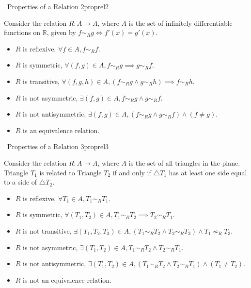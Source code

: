        \begin{exercise}{\Difficulty\,\Difficulty\,\,Properties of a Relation 2}{proprel2}
        
            Consider the relation \(R:A\to A\), where \(A\) is the set of infinitely differentiable functions on \(\mathbb{R}\), given by \(f\sim_Rg\iff f'(x)=g'(x)\).
            \begin{itemize}
                \item \(R\) is reflexive, \(\forall f\in A, f\sim_Rf\).
                \item \(R\) is symmetric, \(\forall (f, g)\in A, f\sim_Rg\implies g\sim_Rf\).
                \item \(R\) is transitive, \(\forall (f, g, h)\in A, (f\sim_Rg\wedge g\sim_Rh)\implies f\sim_Rh\).
                \item \(R\) is not asymmetric, \(\exists (f, g)\in A,f\sim_Rg\wedge g\sim_Rf\).
                \item \(R\) is not antisymmetric, \(\exists (f, g)\in A,(f\sim_Rg\wedge g\sim_Rf)\wedge(f\neq g)\).
                \item \(R\) is an equivalence relation.
            \end{itemize}
        
        \end{exercise}
        \begin{exercise}{\Difficulty\,\Difficulty\,\,Properties of a Relation 3}{proprel3}
        
            Consider the relation \(R:A\to A\), where \(A\) is the set of all triangles in the plane. Triangle \(T_1\) is related to Triangle \(T_2\) if and only if \(\triangle T_1\) has at least one side equal to a side of \(\triangle T_2\).
            \begin{itemize}
                \item \(R\) is reflexive, \(\forall T_1\in A, T_1\sim_RT_1\).
                \item \(R\) is symmetric, \(\forall (T_1, T_2)\in A, T_1\sim_RT_2\implies T_2\sim_RT_1\).
                \item \(R\) is not transitive, \(\exists (T_1, T_2, T_3)\in A, (T_1\sim_RT_2\wedge T_2\sim_RT_3)\wedge T_1\nsim_RT_3\).
                \item \(R\) is not asymmetric, \(\exists (T_1, T_2)\in A,T_1\sim_RT_2\wedge T_2\sim_RT_1\).
                \item \(R\) is not antisymmetric, \(\exists (T_1, T_2)\in A,(T_1\sim_RT_2\wedge T_2\sim_RT_1)\wedge(T_1\neq T_2)\).
                \item \(R\) is not an equivalence relation.
            \end{itemize}
        
        \end{exercise}
